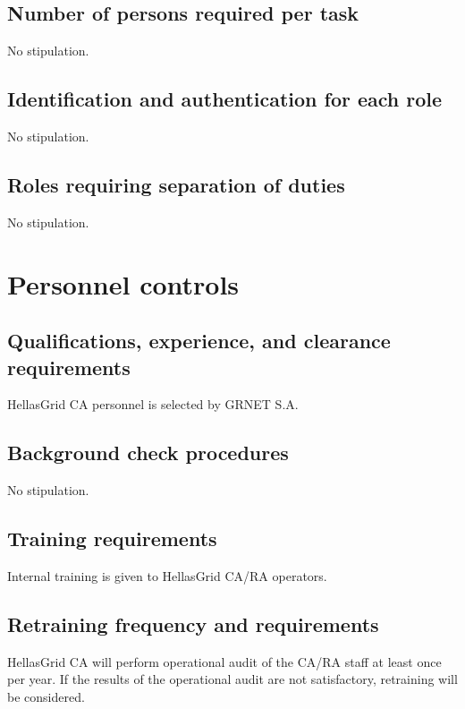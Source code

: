 \subsection{Number of persons required per task}

No stipulation.

\subsection{Identification and authentication for each role}

No stipulation.

\subsection{Roles requiring separation of duties}

No stipulation.

\section{Personnel controls}
\subsection{Qualifications, experience, and clearance requirements}

HellasGrid CA personnel is selected by GRNET S.A.

\subsection{Background check procedures}

No stipulation.

\subsection{Training requirements}

Internal training is given to HellasGrid CA/RA operators.

\subsection{Retraining frequency and requirements}
\label{sub:RetrainingFrequencyAndRequirements}

HellasGrid CA will perform operational audit of the CA/RA staff at least once per year. If the results of the operational audit are not satisfactory, retraining will be considered.

